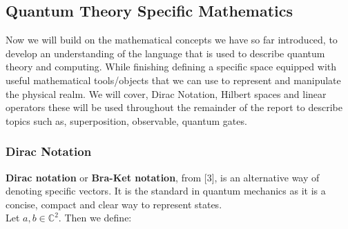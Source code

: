 \subsection{Quantum Theory Specific Mathematics}
\noindent Now we will build on the mathematical concepts we have so far introduced, to develop an understanding of the language that is used to describe quantum theory and computing. While finishing defining a specific  space equipped with useful mathematical tools/objects that we can use to represent and manipulate the physical realm. We will cover, Dirac Notation, Hilbert spaces and linear operators these will be used throughout the remainder of the report to describe topics such as, superposition, observable, quantum gates.


\subsubsection{Dirac Notation}
\noindent \textbf{Dirac notation} or \textbf{Bra-Ket notation}, from [3], is an alternative way of denoting specific vectors. It is the standard in quantum mechanics as it is a concise, compact and clear way to represent states.\\
Let \( a, b \in \mathbb{C}^2 \). Then we define:

